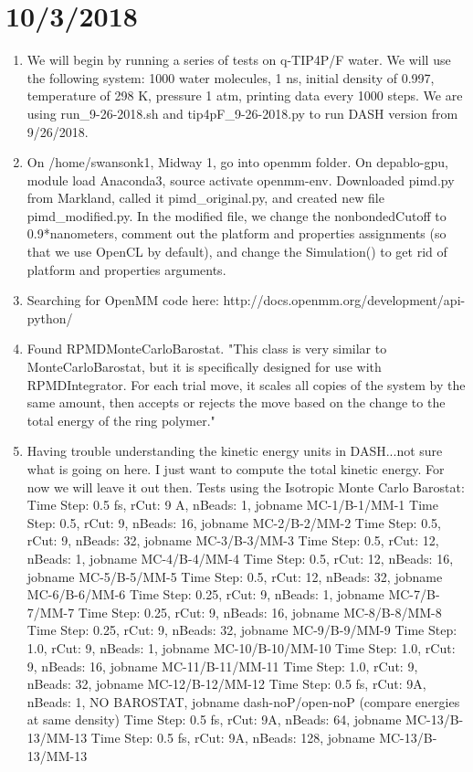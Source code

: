 \documentclass[12pt,reqno]{amsart}
\numberwithin{equation}{section}
\begin{document}
\section{10/3/2018}
\begin{enumerate}
\item We will begin by running a series of tests on q-TIP4P/F water.  We will use the following system: 1000 water molecules, 1 ns, initial density of 0.997, temperature of 298 K, pressure 1 atm, printing data every 1000 steps.  We are using run\_9-26-2018.sh and tip4pF\_9-26-2018.py to run DASH version from 9/26/2018.  
\item On /home/swansonk1, Midway 1, go into openmm folder.  On depablo-gpu, module load Anaconda3, source activate openmm-env.  Downloaded pimd.py from Markland, called it pimd\_original.py, and created new file pimd\_modified.py.  In the modified file, we change the nonbondedCutoff to 0.9*nanometers, comment out the platform and properties assignments (so that we use OpenCL by default), and change the Simulation() to get rid of platform and properties arguments.  
\item Searching for OpenMM code here: http://docs.openmm.org/development/api-python/
\item Found RPMDMonteCarloBarostat.  "This class is very similar to MonteCarloBarostat, but it is specifically designed for use with RPMDIntegrator.  For each trial move, it scales all copies of the system by the same amount, then accepts or rejects the move based on the change to the total energy of the ring polymer."
\item Having trouble understanding the kinetic energy units in DASH...not sure what is going on here.  I just want to compute the total kinetic energy.  For now we will leave it out then.  
\subitem Tests using the Isotropic Monte Carlo Barostat:
\subsubitem Time Step: 0.5 fs, rCut: 9 A, nBeads: 1, jobname MC-1/B-1/MM-1
\subsubitem Time Step: 0.5, rCut: 9, nBeads: 16, jobname MC-2/B-2/MM-2
\subsubitem Time Step: 0.5, rCut: 9, nBeads: 32, jobname MC-3/B-3/MM-3
\subsubitem Time Step: 0.5, rCut: 12, nBeads: 1, jobname MC-4/B-4/MM-4
\subsubitem Time Step: 0.5, rCut: 12, nBeads: 16, jobname MC-5/B-5/MM-5
\subsubitem Time Step: 0.5, rCut: 12, nBeads: 32, jobname MC-6/B-6/MM-6
\subsubitem Time Step: 0.25, rCut: 9, nBeads: 1, jobname MC-7/B-7/MM-7
\subsubitem Time Step: 0.25, rCut: 9, nBeads: 16, jobname MC-8/B-8/MM-8
\subsubitem Time Step: 0.25, rCut: 9, nBeads: 32, jobname MC-9/B-9/MM-9
\subsubitem Time Step: 1.0, rCut: 9, nBeads: 1, jobname MC-10/B-10/MM-10
\subsubitem Time Step: 1.0, rCut: 9, nBeads: 16, jobname MC-11/B-11/MM-11
\subsubitem Time Step: 1.0, rCut: 9, nBeads: 32, jobname MC-12/B-12/MM-12
\subsubitem Time Step: 0.5 fs, rCut: 9A, nBeads: 1, NO BAROSTAT, jobname dash-noP/open-noP (compare energies at same density)
\subsubitem Time Step: 0.5 fs, rCut: 9A, nBeads: 64, jobname MC-13/B-13/MM-13
\subsubitem Time Step: 0.5 fs, rCut: 9A, nBeads: 128, jobname MC-13/B-13/MM-13
\end{enumerate}
\end{document}
